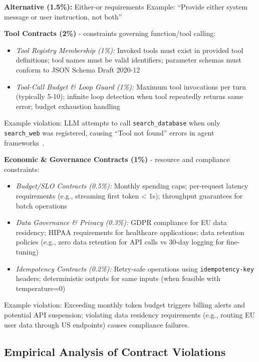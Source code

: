 \documentclass[11pt]{article}
\begin{document}
\textbf{Alternative (1.5\%):} Either-or requirements
Example: ``Provide either system message or user instruction, not both''

\textbf{Tool Contracts (2\%)} - constraints governing function/tool calling:
\begin{itemize}
    \item \textit{Tool Registry Membership (1\%):} Invoked tools must exist in provided tool definitions; tool names must be valid identifiers; parameter schemas must conform to JSON Schema Draft 2020-12~\cite{openai2023docs}
    \item \textit{Tool-Call Budget \& Loop Guard (1\%):} Maximum tool invocations per turn (typically 5-10); infinite loop detection when tool repeatedly returns same error; budget exhaustion handling
\end{itemize}

Example violation: LLM attempts to call \texttt{search\_database} when only \texttt{search\_web} was registered, causing ``Tool not found'' errors in agent frameworks~\cite{githublangchain18279}.

\textbf{Economic \& Governance Contracts (1\%)} - resource and compliance constraints:
\begin{itemize}
    \item \textit{Budget/SLO Contracts (0.5\%):} Monthly spending caps; per-request latency requirements (e.g., streaming first token < 1s); throughput guarantees for batch operations
    \item \textit{Data Governance \& Privacy (0.3\%):} GDPR compliance for EU data residency; HIPAA requirements for healthcare applications; data retention policies (e.g., zero data retention for API calls vs 30-day logging for fine-tuning)
    \item \textit{Idempotency Contracts (0.2\%):} Retry-safe operations using \texttt{idempotency-key} headers; deterministic outputs for same inputs (when feasible with temperature=0)
\end{itemize}

Example violation: Exceeding monthly token budget triggers billing alerts and potential API suspension; violating data residency requirements (e.g., routing EU user data through US endpoints) causes compliance failures.

\subsection{Empirical Analysis of Contract Violations}
\label{sec:empirical}
\end{document}
